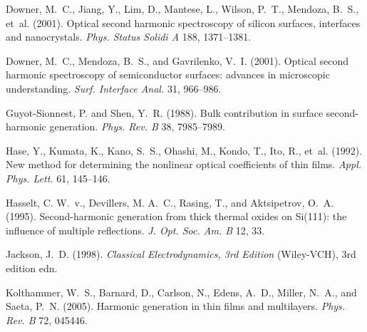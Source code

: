 \documentclass[utf8]{frontiersSCNS}
\begin{document}
\begin{thebibliography}{39}
Downer, M.~C., Jiang, Y., Lim, D., Mantese, L., Wilson, P.~T., Mendoza, B.~S.,
  et~al. (2001{}).
\newblock Optical second harmonic spectroscopy of silicon surfaces, interfaces
  and nanocrystals.
\newblock \emph{Phys. Status Solidi A} 188, 1371--1381.
\newblock {}

Downer, M.~C., Mendoza, B.~S., and Gavrilenko, V.~I. (2001{}).
\newblock Optical second harmonic spectroscopy of semiconductor surfaces:
  advances in microscopic understanding.
\newblock \emph{Surf. Interface Anal.} 31, 966--986.
\newblock {}

Guyot-Sionnest, P. and Shen, Y.~R. (1988).
\newblock Bulk contribution in surface second-harmonic generation.
\newblock \emph{Phys. Rev. B} 38, 7985--7989.
\newblock {}

Hase, Y., Kumata, K., Kano, S.~S., Ohashi, M., Kondo, T., Ito, R., et~al.
  (1992).
\newblock New method for determining the nonlinear optical coefficients of thin
  films.
\newblock \emph{Appl. Phys. Lett.} 61, 145--146.
\newblock {}

Hasselt, C. W.~v., Devillers, M. A.~C., Rasing, T., and Aktsipetrov, O.~A.
  (1995).
\newblock Second-harmonic generation from thick thermal oxides on {Si}(111):
  the influence of multiple reflections.
\newblock \emph{J. Opt. Soc. Am. B} 12, 33.
\newblock {}

Jackson, J.~D. (1998).
\newblock \emph{Classical Electrodynamics, 3rd Edition} (Wiley-VCH), 3rd
  edition edn.

Kolthammer, W.~S., Barnard, D., Carlson, N., Edens, A.~D., Miller, N.~A., and
  Saeta, P.~N. (2005).
\newblock Harmonic generation in thin films and multilayers.
\newblock \emph{Phys. Rev. B} 72, 045446.
\newblock {}


\end{thebibliography}
\end{document}
